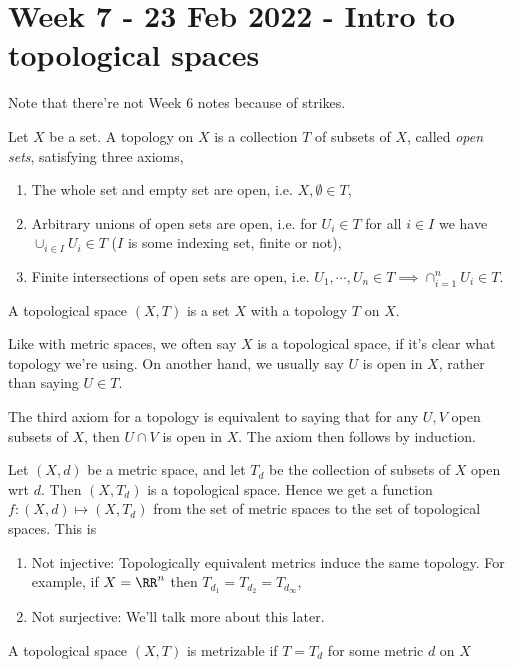 \section{Week 7 - 23 Feb 2022 - Intro to topological spaces}
Note that there're not Week 6 notes because of strikes.
\begin{definition}
  Let $X$ be a set. A topology on $X$ is a collection $T$ of subsets of $X$,
  called \emph{open sets}, satisfying three axioms,
  \begin{enumerate}
    \item The whole set and empty set are open, i.e. $X,\emptyset\in T$,
    \item Arbitrary unions of open sets are open, i.e. for $U_i\in T$ for all
      $i\in I$ we have $\cup_{i\in I} U_i\in T$ ($I$ is some indexing set,
      finite or not),
    \item Finite intersections of open sets are open, i.e. $U_1,\cdots, U_n\in T
      \implies \cap_{i=1}^n U_i \in T$.
  \end{enumerate}
  A topological space $(X,T)$ is a set $X$ with a topology $T$ on $X$.
  \label{def:topology}
\end{definition}
\begin{remark}
  Like with metric spaces, we often say $X$ is a topological space, if it's
  clear what topology we're using. On another hand, we usually say $U$ is open
  in $X$, rather than saying $U\in T$.
\end{remark}
\begin{remark}
  The third axiom for a topology is equivalent to saying that for any $U,V$ open
  subsets of $X$, then $U\cap V$ is open in $X$. The axiom then follows by
  induction.
\end{remark}
\begin{example}
  Let $(X,d)$ be a metric space, and let $T_d$ be the collection of subsets of
  $X$ open wrt $d$. Then $(X,T_d)$ is a topological space. Hence we get a
  function $f:(X,d)\mapsto (X,T_d)$ from the set of metric spaces to the set of
  topological spaces. This is 
  \begin{enumerate}
    \item Not injective: Topologically equivalent metrics induce the same
      topology. For example, if $X=\RR^n$ then $T_{d_1}=T_{d_2}=T_{d_{\infty}}$,
    \item Not surjective: We'll talk more about this later.
  \end{enumerate}
\end{example}
\begin{definition}
  A topological space $(X,T)$ is metrizable if $T=T_d$ for some metric $d$ on
  $X$
  \label{<+label+>}
\end{definition}
